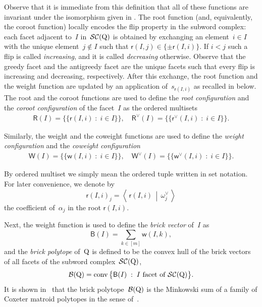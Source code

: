 \documentclass[ALCO,Unicode,ThmDefs]{cedram}
\DeclareMathOperator{\conv}{conv}
\newcommand{\Dfn}[1]{\emph{#1}}
\newcommand{\subwordComplex}{\mathcal{SC}}
\newcommand{\sq}[1]{{\rm #1}}
\newcommand{\Q}{\sq{Q}}
\newcommand{\sfr}{\mathsf{r}}
\newcommand{\sfR}{\mathsf{R}}
\newcommand{\sfw}{\mathsf{w}}
\newcommand{\sfW}{\mathsf{W}}
\newcommand{\sfB}{\mathsf{B}}
\newcommand{\brickVector}{\sfB}
\newcommand{\brickPolytope}{\mathcal{B}}
\newcommand{\Root}[2]{{\sfr}(#1,#2)}
\newcommand{\Roots}[1]{{\sfR}(#1)}
\newcommand{\Weight}[2]{{\sfw}(#1,#2)}
\newcommand{\Weights}[1]{{\sfW}(#1)}
\newcommand{\coRoot}[2]{{\sfr^\vee}(#1,#2)}
\newcommand{\coRoots}[1]{{\sfR^\vee}(#1)}
\newcommand{\coWeight}[2]{{\sfw^\vee}(#1,#2)}
\newcommand{\coWeights}[1]{{\sfW^\vee}(#1)}
\newcommand{\bigset}[2]{\big\{ #1 \;:\; #2 \big\}}
\newcommand{\bigmultiset}[2]{\big\{\!\!\big\{ #1 \;:\; #2 \big\}\!\!\big\}}
\newcommand{\dotprod}[2]{\left\langle \, #1 \,\middle|\, #2 \, \right\rangle}
\begin{document}
Observe that it is immediate from this definition that all of these functions are invariant under the isomorphism given in . The root function (and, equivalently, the coroot function) locally encodes the flip property in the subword complex: each facet adjacent to~$I$ in~$\subwordComplex(\Q)$ is obtained by exchanging an element~${i \in I}$ with the unique element~$j \notin I$ such that $\Root{I}{j} \in \{ \pm \Root{I}{i} \}$. If $i < j$ such a flip is called \Dfn{increasing}, and it is called \Dfn{decreasing} otherwise. Observe that the greedy facet and the antigreedy facet are the unique facets such that every flip is increasing and decreasing, respectively. After this exchange, the root function and the weight function are updated by an application of~$s_{\Root{I}{i}}$ as recalled in  below. The root and the coroot functions are used to define the \Dfn{root configuration} and the \Dfn{coroot configuration} of the facet~$I$ as the ordered multisets
\begin{align}
\Roots{I} = \bigmultiset{\Root{I}{i}}{i \in I},\quad \coRoots{I} = \bigmultiset{\coRoot{I}{i}}{i \in I}. \label{eq:rootconfiguration}
\end{align}

Similarly, the weight and the coweight functions are used to define the \Dfn{weight configuration} and the \Dfn{coweight configuration}
\begin{align}
\Weights{I} = \bigmultiset{\Weight{I}{i}}{i \in I},\quad \coWeights{I} = \bigmultiset{\coWeight{I}{i}}{i \in I}. \label{eq:weightconfiguration}
\end{align}

By ordered multiset we simply mean the ordered tuple written in set notation. For later convenience, we denote by
\[
\Root{I}{i}_j = \dotprod{\Root{I}{i}}{\omega_j^\vee}
\]
the coefficient of~$\alpha_j$ in the root $\Root{I}{i}$.


Next, the weight function is used to define the \Dfn{brick vector} of~$I$ as
\[
\brickVector(I) = \sum_{k \in [m]} \Weight{I}{k},
\]
and the \Dfn{brick polytope} of~$\Q$ is defined to be the convex hull of the brick vectors of all facets of the subword complex~$\subwordComplex(\Q)$,
\[
\brickPolytope(\Q) = \conv \bigset{\brickVector(I)}{I \text{ facet of } \subwordComplex(\Q)}.
\]
It is shown in~\cite{PS2015} that the brick polytope~$\brickPolytope(\Q)$ is the Minkowski sum of a family of Coxeter matroid polytopes in the sense of~\cite{BGW2003}.
\end{document}

